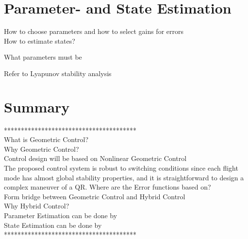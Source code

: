 \section{Parameter- and State Estimation}

How to choose parameters and how to select gains for errors\\

How to estimate states?



What parameters must be 

Refer to Lyapunov stability analysis \cite{Bullo2005}

\section{Summary}

***************************************\\
What is Geometric Control?\\
Why Geometric Control?\\
Control design will be based on Nonlinear Geometric Control\\

The proposed control system is robust to switching conditions since each flight mode has almost global stability properties, and it is straightforward to design a complex maneuver of a QR. \cite{Lee2010c}
Where are the Error functions based on?\\

Form bridge between Geometric Control and Hybrid Control\\
Why Hybrid Control?\\

Parameter Estimation can be done by\\
State Estimation can be done by\\

***************************************\\
